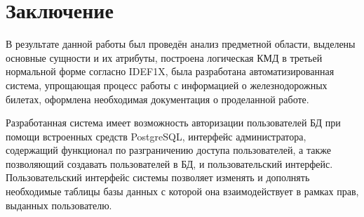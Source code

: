 \section{Заключение}

В результате данной работы был проведён анализ предметной области, выделены основные сущности и их атрибуты, построена логическая КМД в третьей нормальной форме согласно IDEF1X, была разработана автоматизированная система, упрощающая процесс работы с информацией о железнодорожных билетах, оформлена необходимая документация о проделанной работе.\par 

Разработанная система имеет возможность авторизации пользователей БД при помощи встроенных средств PostgreSQL, интерфейс администратора, содержащий функционал по разграничению доступа пользователей, а также позволяющий создавать пользователей в БД, и пользовательский интерфейс. Пользовательский интерфейс системы позволяет изменять и дополнять необходимые таблицы базы данных с которой она взаимодействует в рамках прав, выданных пользователю.\par 

\clearpage